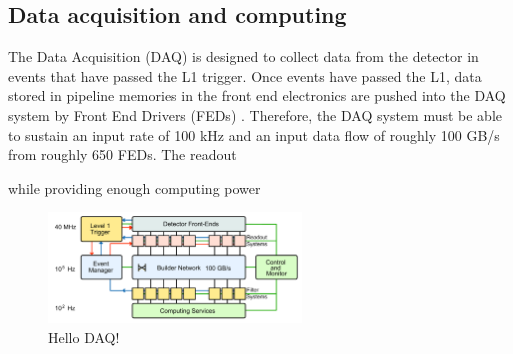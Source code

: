 \subsection{Data acquisition and computing}
\label {sec:daq}

The Data Acquisition (DAQ)
is designed to collect data from the detector
in events that have passed the L1 trigger.
Once events have passed the L1, data stored 
in pipeline memories in the front end electronics
are pushed into the DAQ system by Front End Drivers
(FEDs) .
Therefore, the DAQ system must be able to sustain
an input rate of 100 kHz and an input data flow of
roughly 100 GB/s from roughly 650 FEDs.
The readout 

while providing enough
computing power


\begin{figure}
  \centering
  \includegraphics[width=0.6\textwidth]{tex/cms/fig/daq-schematic.pdf}
  \caption{Hello DAQ! \cite{cms-jinst}}
  \label{fig:daq}
\end{figure}
